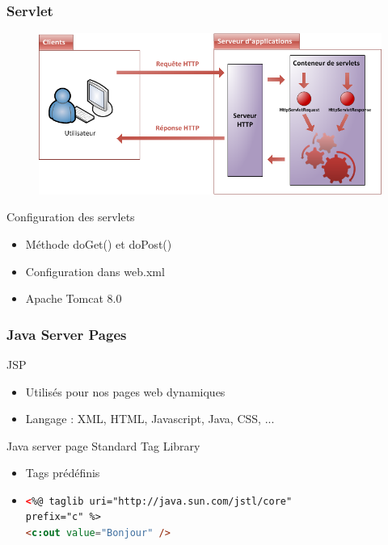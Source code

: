 \begin{frame}
    \frametitle{Servlet}
    	  \begin{figure}[H]
      \center
      \includegraphics[scale=0.24]{images/serveurclient.png}
      \end{figure}

	\begin{block}{Configuration des servlets}
		\begin{itemize}
			\item Méthode doGet() et doPost()
			\item Configuration dans web.xml
			\item Apache Tomcat 8.0
		\end{itemize}
	\end{block}
\end{frame}


\begin{frame}[fragile]
    \frametitle{Java Server Pages}
    	  
	\begin{block}{JSP}
		\begin{itemize}
			\item Utilisés pour nos pages web dynamiques
			\item Langage : XML, HTML, Javascript, Java, CSS, ...
		\end{itemize}
	\end{block}
	\begin{block}{Java server page Standard Tag Library}
		\begin{itemize}
			\item Tags prédéfinis
			\item \begin{lstlisting}[language=HTML, basicstyle=\scriptsize] 
<%@ taglib uri="http://java.sun.com/jstl/core" 
prefix="c" %>
<c:out value="Bonjour" />
\end{lstlisting}	  
		\end{itemize}	
			
	\end{block}
\end{frame}

